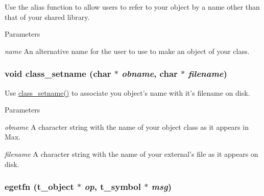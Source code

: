 Use the alias function to allow users to refer to your object by a name other than that of your shared library. 
\begin{DoxyParams}{Parameters}
\item[{\em name}]An alternative name for the user to use to make an object of your class. \end{DoxyParams}
\hypertarget{group__class__old_gafb05186b12fb0dceeb3185b2f59b6307}{
\subsubsection[{class\_\-setname}]{\setlength{\rightskip}{0pt plus 5cm}void class\_\-setname (char $\ast$ {\em obname}, \/  char $\ast$ {\em filename})}}
\label{group__class__old_gafb05186b12fb0dceeb3185b2f59b6307}


Use \hyperlink{group__class__old_gafb05186b12fb0dceeb3185b2f59b6307}{class\_\-setname()} to associate you object’s name with it’s filename on disk. 
\begin{DoxyParams}{Parameters}
\item[{\em obname}]A character string with the name of your object class as it appears in Max. \item[{\em filename}]A character string with the name of your external’s file as it appears on disk. \end{DoxyParams}
\hypertarget{group__class__old_ga96dfd8b6f4c7111c34f1c2103fbdcdf0}{
\subsubsection[{egetfn}]{ egetfn ({\bf t\_\-object} $\ast$ {\em op}, \/  {\bf t\_\-symbol} $\ast$ {\em msg})}}
\label{group__class__old_ga96dfd8b6f4c7111c34f1c2103fbdcdf0}


